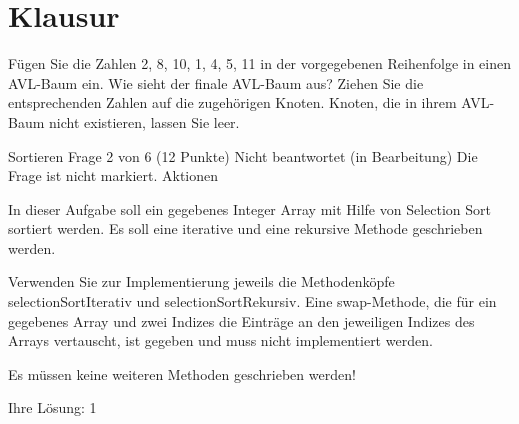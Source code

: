 \documentclass{lehramt-informatik-haupt}
\begin{document}

\chapter{Klausur}

Fügen Sie die Zahlen 2, 8, 10, 1, 4, 5, 11 in der vorgegebenen Reihenfolge in einen AVL-Baum ein. Wie sieht der finale AVL-Baum aus? Ziehen Sie die entsprechenden Zahlen auf die zugehörigen Knoten. Knoten, die in ihrem AVL-Baum nicht existieren, lassen Sie leer.

Sortieren
Frage 2 von 6 (12 Punkte)
Nicht beantwortet (in Bearbeitung)
Die Frage ist nicht markiert.  Aktionen

In dieser Aufgabe soll ein gegebenes Integer Array mit Hilfe von Selection Sort sortiert werden. Es soll eine iterative und eine rekursive Methode geschrieben werden.

Verwenden Sie zur Implementierung jeweils die Methodenköpfe selectionSortIterativ und selectionSortRekursiv. Eine swap-Methode, die für ein gegebenes Array und zwei Indizes die Einträge an den jeweiligen Indizes des Arrays vertauscht, ist gegeben und muss nicht implementiert werden.

Es müssen keine weiteren Methoden geschrieben werden!

Ihre Lösung:
1
\end{document}
